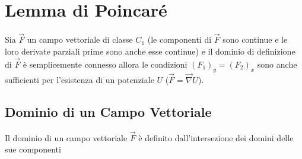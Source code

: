 \section{Lemma di Poincaré}
Sia $\vec{F}$ un campo vettoriale di classe $C_1$ (le componenti di $\vec{F}$ sono continue e le loro derivate parziali prime sono anche esse continue) e il dominio di definizione di $\vec{F}$ è semplicemente connesso allora le condizioni $(F_1)_y = (F_2)_x$ sono anche sufficienti per l'esistenza di un potenziale $U$ ($\vec{F} = \vec{\nabla} U$).

\subsection{Dominio di un Campo Vettoriale}
Il dominio di un campo vettoriale $\vec{F}$ è definito dall'intersezione dei domini delle sue componenti
